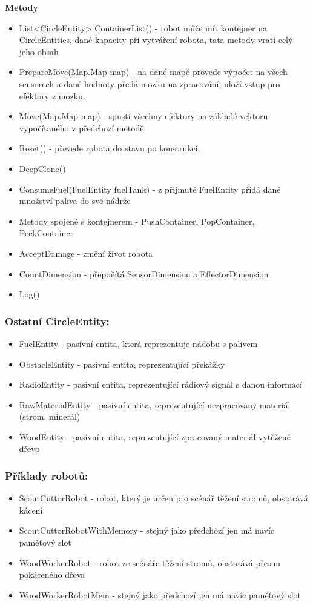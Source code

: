 \documentclass[12pt, oneside]{article}
\begin{document}
	\textbf{Metody} 
	\begin{itemize}
	\item List<CircleEntity> ContainerList() - robot může mít kontejner na CircleEntities, dané kapacity při vytváření robota, tata metody vratí celý jeho obsah
	\item PrepareMove(Map.Map map) - na dané mapě provede výpočet na všech sensorech a dané hodnoty předá mozku na zpracování, uloží vstup pro efektory z mozku. 
	\item Move(Map.Map map) - spustí všechny efektory na základě vektoru vypočítaného v předchozí metodě. 
	\item Reset() - převede robota do stavu po konstrukci. 
	\item DeepClone() 
	\item ConsumeFuel(FuelEntity fuelTank) - z přijmuté FuelEntity přidá dané množství paliva do své nádrže
	\item Metody spojené s kontejnerem - PushContainer, PopContainer, PeekContainer
	\item AcceptDamage - změní život robota
	\item CountDimension - přepočítá SensorDimension a EffectorDimension
	\item Log() 
\end{itemize}
\newpage

\subsubsection{Ostatní CircleEntity: }
\begin{itemize}
\item FuelEntity - pasivní entita, která reprezentuje nádobu s palivem
\item ObstacleEntity - pasivní entita, reprezentující překážky
\item  RadioEntity  - pasivní entita, reprezentující rádiový signál s danou informací 
\item  RawMaterialEntity - pasivní entita, reprezentující nezpracovaný materiál (strom, minerál) 
\item  WoodEntity - pasivní entita, reprezentující zpracovaný materiál vytěžené dřevo
\end{itemize}
\subsubsection{Příklady robotů:}
\begin{itemize}
\item ScoutCuttorRobot - robot, který je určen pro scénář těžení stromů, obstarává kácení
\item ScoutCuttorRobotWithMemory -  stejný jako předchozí jen má navíc paměťový slot
\item WoodWorkerRobot - robot ze scénáře těžení stromů, obstarává přesun pokáceného dřeva 
\item WoodWorkerRobotMem - stejný jako předchozí jen má navíc paměťový slot
\end{itemize}
\newpage 
\end{document}
